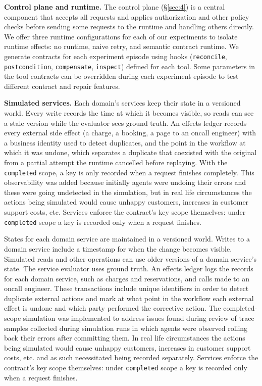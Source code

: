 \documentclass[letterpaper,twocolumn,10pt]{article}
\begin{document}
\textbf{Control plane and runtime.} The control plane (\S\ref{sec:4}) is a central component that accepts all requests and applies authorization and other policy checks before sending some requests to the runtime and handling others directly. We offer three runtime configurations for each of our experiments to isolate runtime effects: no runtime, naive retry, and semantic contract runtime. We generate contracts for each experiment episode using hooks (\texttt{reconcile}, \texttt{postcondition}, \texttt{compensate}, \texttt{inspect}) defined for each tool. Some parameters in the tool contracts can be overridden during each experiment episode to test different contract and repair features.

\textbf{Simulated services.} Each domain's services keep their state in a versioned world. Every write records the time at which it becomes visible, so reads can see a stale version while the evaluator sees ground truth. An effects ledger records every external side effect (a charge, a booking, a page to an oncall engineer) with a business identity used to detect duplicates, and the point in the workflow at which it was undone, which separates a duplicate that coexisted with the original from a partial attempt the runtime cancelled before replaying. With the \texttt{completed} scope, a key is only recorded when a request finishes completely. This observability was added because initially agents were undoing their errors and these were going undetected in the simulation, but in real life circumstances the actions being simulated would cause unhappy customers, increases in customer support costs, etc. Services enforce the contract's key scope themselves: under \texttt{completed} scope a key is recorded only when a request finishes.

States for each domain service are maintained in a versioned world. Writes to a domain service include a timestamp for when the change becomes visible. Simulated reads and other operations can use older versions of a domain service's state. The service evaluator uses ground truth. An effects ledger logs the records for each domain service, such as charges and reservations, and calls made to an oncall engineer. These transactions include unique identifiers in order to detect duplicate external actions and mark at what point in the workflow each external effect is undone and which party performed the corrective action. The completed-scope simulation was implemented to address issues found during review of trace samples collected during simulation runs in which agents were observed rolling back their errors after committing them. In real life circumstances the actions being simulated would cause unhappy customers, increases in customer support costs, etc. and as such necessitated being recorded separately. Services enforce the contract's key scope themselves: under \texttt{completed} scope a key is recorded only when a request finishes.
\end{document}
